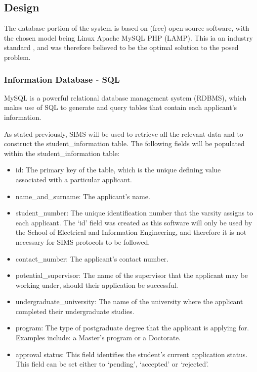 \documentclass[journal]{IEEEtran}
\begin{document}
\subsection{Design}

The database portion of the system is based on (free) open-source software, with the chosen model being Linux Apache MySQL PHP (LAMP). This ia an industry standard \cite{lamp}, and was therefore believed to be the optimal solution to the posed problem. \vspace{2mm}

\subsubsection{Information Database - SQL}

MySQL is a powerful relational database management system (RDBMS), which makes use of SQL to generate and query tables that contain each applicant's information. \vspace{2mm}

As stated previously, SIMS will be used to retrieve all the relevant data and to construct the student\_information table. The following fields will be populated within the student\_information table: 

\begin{itemize}
	\item id: The primary key of the table, which is the unique defining value associated with a particular applicant.
	\item name\_and\_surname: The applicant's name.
	\item student\_number: The unique identification number that the varsity assigns to each applicant. The `id' field was created as this software will only be used by the School of Electrical and Information Engineering, and therefore it is not necessary for SIMS protocols to be followed.
	\item contact\_number: The applicant's contact number.
	\item potential\_supervisor: The name of the supervisor that the applicant may be working under, should their application be successful.
	\item undergraduate\_university: The name of the university where the applicant completed their undergraduate studies.
	\item program: The type of postgraduate degree that the applicant is applying for. Examples include: a Master's program or a Doctorate.
	\item approval status: This field identifies the student's current application status. This field can be set either to `pending', `accepted' or `rejected'.
\end{itemize}
\end{document}
